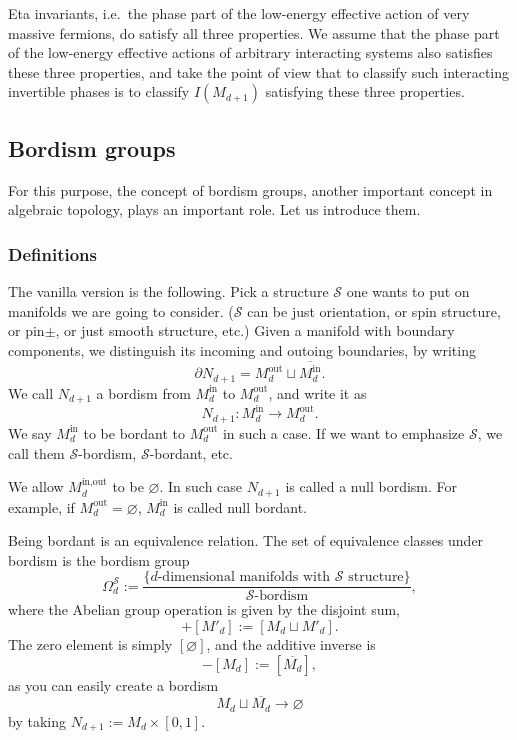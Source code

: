 \documentclass[12pt]{article}
\numberwithin{equation}{section}
\numberwithin{figure}{section}
\theoremstyle{remark}
\def\cS{\mathcal{S}}
\begin{document}
Eta invariants, i.e.~the phase part of the low-energy effective action of very massive fermions,
do satisfy all three properties.
We assume that the phase part of the low-energy effective actions
of arbitrary interacting systems also satisfies these three properties,
and take the point of view that to classify such interacting invertible phases
is to classify $I(M_{d+1})$ satisfying these three properties.

\subsection{Bordism groups}
For this purpose, the concept of bordism groups, another important concept in algebraic topology, plays an important role.
Let us introduce them.

\subsubsection{Definitions}
The vanilla version is the following.
Pick a structure $\cS$ one wants to put on manifolds we are going to consider.
($\cS$ can be just orientation, or spin structure, or pin$\pm$, or just smooth structure, etc.)
Given a manifold with boundary components, we distinguish its incoming and outoing boundaries,
by writing \begin{equation}
\partial N_{d+1}= M_d^\text{out} \sqcup \overline{M_d^\text{in}}.
\end{equation}
We call $N_{d+1}$ a bordism from $M_d^\text{in}$ to $M_d^\text{out}$, and write it as \begin{equation}
N_{d+1} \colon M_d^\text{in} \to M_d^\text{out}.
\end{equation}
We say $M_d^\text{in}$ to be bordant to $M_d^\text{out}$ in such a case.
If we want to emphasize $\cS$, we call them $\cS$-bordism, $\cS$-bordant, etc.

We allow $M_d^\text{in,out}$ to be $\varnothing$. 
In such case $N_{d+1}$ is called a null bordism. For example, if $M_d^\text{out}=\varnothing$,
$M_d^\text{in}$ is called null bordant.

Being bordant is an equivalence relation. The set of equivalence classes under bordism is the bordism group \begin{equation}
\Omega^\cS_d := \frac{
\{\text{$d$-dimensional manifolds with $\cS$ structure} \} 
} { \text{$\cS$-bordism} },
\end{equation}
where the Abelian group operation is given by the disjoint sum, \begin{equation}
[M_d] + [M'_d] := [M_d \sqcup M'_d].
\end{equation} 
The zero element is simply $[\varnothing]$,
and the additive inverse is \begin{equation}
-[M_d] := [\overline{M_d}],
\end{equation} as you can easily create a bordism  
\begin{equation}
M_d \sqcup \overline{M_d} \to \varnothing
\end{equation} by taking $N_{d+1}:=M_d \times [0,1]$.
\end{document}
